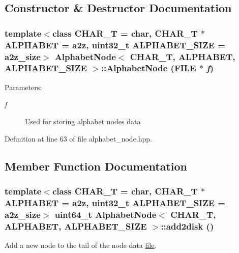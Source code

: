 \subsection{Constructor \& Destructor Documentation}
\hypertarget{classAlphabetNode_aa35cf0cfb203b660441bb1ce783b2d0}{
\subsubsection[{AlphabetNode}]{\setlength{\rightskip}{0pt plus 5cm}template$<$class CHAR\_\-T  = char, CHAR\_\-T $\ast$ ALPHABET = a2z, uint32\_\-t ALPHABET\_\-SIZE = a2z\_\-size$>$ {\bf AlphabetNode}$<$ CHAR\_\-T, ALPHABET, ALPHABET\_\-SIZE $>$::{\bf AlphabetNode} (FILE $\ast$ {\em f})}}
\label{classAlphabetNode_aa35cf0cfb203b660441bb1ce783b2d0}


\begin{Desc}
\item[Parameters:]
\begin{description}
\item[{\em f}]Used for storing alphabet nodes data \end{description}
\end{Desc}


Definition at line 63 of file alphabet\_\-node.hpp.

\subsection{Member Function Documentation}
\hypertarget{classAlphabetNode_4d663c0c287bf1a5144272815c4f3486}{
\subsubsection[{add2disk}]{\setlength{\rightskip}{0pt plus 5cm}template$<$class CHAR\_\-T  = char, CHAR\_\-T $\ast$ ALPHABET = a2z, uint32\_\-t ALPHABET\_\-SIZE = a2z\_\-size$>$ uint64\_\-t {\bf AlphabetNode}$<$ CHAR\_\-T, ALPHABET, ALPHABET\_\-SIZE $>$::add2disk ()}}
\label{classAlphabetNode_4d663c0c287bf1a5144272815c4f3486}


Add a new node to the tail of the node data \hyperlink{classfile}{file}. 

